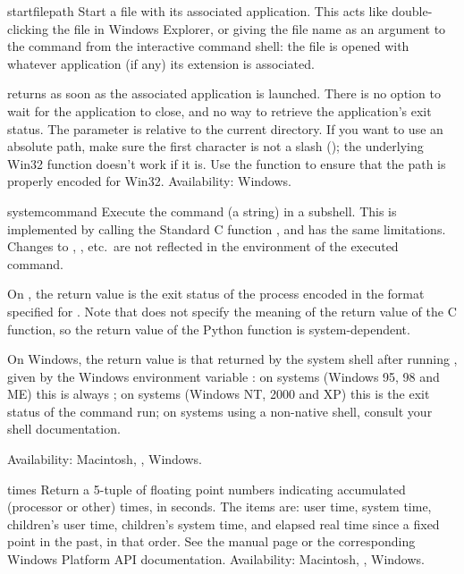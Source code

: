 \begin{funcdesc}{startfile}{path}
Start a file with its associated application.  This acts like
double-clicking the file in Windows Explorer, or giving the file name
as an argument to the  command from the interactive
command shell: the file is opened with whatever application (if any)
its extension is associated.

 returns as soon as the associated application
is launched.  There is no option to wait for the application to close,
and no way to retrieve the application's exit status.  The 
parameter is relative to the current directory.  If you want to use an
absolute path, make sure the first character is not a slash
(\character{/}); the underlying Win32 
function doesn't work if it is.  Use the 
function to ensure that the path is properly encoded for Win32.
Availability: Windows.
\end{funcdesc}

\begin{funcdesc}{system}{command}
Execute the command (a string) in a subshell.  This is implemented by
calling the Standard C function , and has the
same limitations.  Changes to , ,
etc.\ are not reflected in the environment of the executed command.

On \UNIX, the return value is the exit status of the process encoded in the
format specified for .  Note that \POSIX{} does not
specify the meaning of the return value of the C 
function, so the return value of the Python function is system-dependent.

On Windows, the return value is that returned by the system shell after
running , given by the Windows environment variable
: on  systems (Windows 95, 98 and ME)
this is always ; on  systems (Windows NT, 2000
and XP) this is the exit status of the command run; on systems using
a non-native shell, consult your shell documentation.

Availability: Macintosh, \UNIX, Windows.
\end{funcdesc}

\begin{funcdesc}{times}{}
Return a 5-tuple of floating point numbers indicating accumulated
(processor or other)
times, in seconds.  The items are: user time, system time, children's
user time, children's system time, and elapsed real time since a fixed
point in the past, in that order.  See the \UNIX{} manual page
 or the corresponding Windows Platform API
documentation.
Availability: Macintosh, \UNIX, Windows.
\end{funcdesc}

